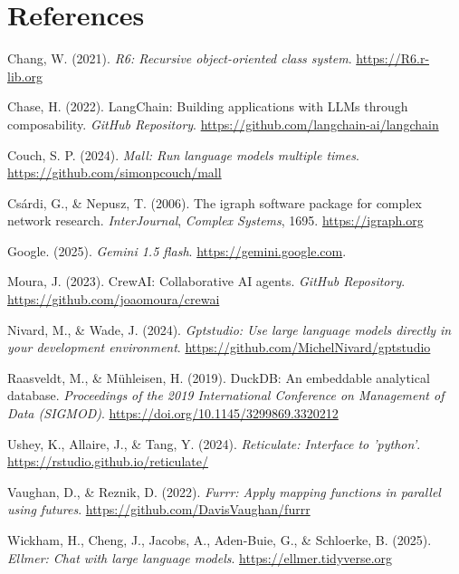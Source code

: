 \documentclass[
]{article}
\newlength{\cslhangindent}
\newenvironment{CSLReferences}[2] %
 {\begin{list}{}{%
  \setlength{\itemindent}{0pt}
  \setlength{\leftmargin}{0pt}
  \setlength{\parsep}{0pt}
  \ifodd #1
   \setlength{\leftmargin}{\cslhangindent}
   \setlength{\itemindent}{-1\cslhangindent}
  \fi
  \setlength{\itemsep}{#2\baselineskip}}}
 {\end{list}}
\begin{document}
\section*{References}\label{references}

\protect{}\label{refs}
\begin{CSLReferences}{1}{0}
Chang, W. (2021). \emph{R6: Recursive object-oriented class system}.
\url{https://R6.r-lib.org}

Chase, H. (2022). LangChain: Building applications with LLMs through
composability. \emph{GitHub Repository}.
\url{https://github.com/langchain-ai/langchain}

Couch, S. P. (2024). \emph{Mall: Run language models multiple times}.
\url{https://github.com/simonpcouch/mall}

Csárdi, G., \& Nepusz, T. (2006). The igraph software package for
complex network research. \emph{InterJournal}, \emph{Complex Systems},
1695. \url{https://igraph.org}

Google. (2025). \emph{Gemini 1.5 flash}.
\url{https://gemini.google.com}.

Moura, J. (2023). CrewAI: Collaborative AI agents. \emph{GitHub
Repository}. \url{https://github.com/joaomoura/crewai}

Nivard, M., \& Wade, J. (2024). \emph{Gptstudio: Use large language
models directly in your development environment}.
\url{https://github.com/MichelNivard/gptstudio}

Raasveldt, M., \& Mühleisen, H. (2019). DuckDB: An embeddable analytical
database. \emph{Proceedings of the 2019 International Conference on
Management of Data (SIGMOD)}.
\url{https://doi.org/10.1145/3299869.3320212}

Ushey, K., Allaire, J., \& Tang, Y. (2024). \emph{Reticulate: Interface
to 'python'}. \url{https://rstudio.github.io/reticulate/}

Vaughan, D., \& Reznik, D. (2022). \emph{Furrr: Apply mapping functions
in parallel using futures}. \url{https://github.com/DavisVaughan/furrr}

Wickham, H., Cheng, J., Jacobs, A., Aden-Buie, G., \& Schloerke, B.
(2025). \emph{Ellmer: Chat with large language models}.
\url{https://ellmer.tidyverse.org}

\end{CSLReferences}
\end{document}
